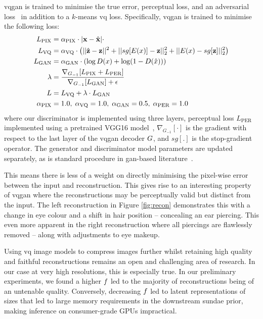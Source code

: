 \Gls{vqgan} is trained to minimise the true error, perceptual loss, and an
adversarial loss~\cite{esser2021taming} in addition to a $k$-means \gls{vq}
loss. Specifically, \gls{vqgan} is trained to minimise the following
loss:
\begin{align}
\begin{split}
    L_\text{PIX} &= \alpha_\text{PIX} \cdot |\mathbf{x} - \hat{\mathbf{x}}| \cdot \\
    L_\text{VQ} &= \alpha_\text{VQ} \cdot \left(||\hat{\mathbf{z}} -
    \mathbf{z}||^2 + ||sg[E(x)] - \mathbf{z}||^2_2 + ||E(x) -
    sg[\mathbf{z}]||^2_2\right)\\
    L_\text{GAN} &= \alpha_\text{GAN} \cdot \left(\log D(x) + \log
    (1-D(\hat{x}))\right) \\
    \lambda &= \frac{\nabla_{G_{-1}}[L_\text{PIX} +
    L_\text{PER}]}{\nabla_{G_{-1}}[L_\text{GAN}] + \epsilon}\\
    L &= L_\text{VQ} + \lambda \cdot L_\text{GAN}\\
    \alpha_\text{PIX} &= 1.0,\; \alpha_\text{VQ} = 1.0,\; \alpha_\text{GAN} = 0.5,\; \alpha_\text{PER} = 1.0
\end{split}
\end{align}
\cite{esser2021taming} where our discriminator is implemented using three
layers, perceptual loss $L_\text{PER}$ implemented using a pretrained VGG16
model~\cite{karen2014vg18}, $\nabla_{G_{-1}}[\cdot]$ is the gradient with
respect to the last layer of the \gls{vqgan} decoder $G$, and
$sg[.]$ is the stop-gradient operator. The
generator and discriminator model parameters are updated separately, as is
standard procedure in \gls{gan}-based literature~\cite{esser2021taming}.

This means there is less of a weight on directly minimising the pixel-wise error
between the input and reconstruction. This gives rise to an interesting property
of \gls{vqgan} where the reconstructions may be perceptually valid but 
distinct from the input. The left reconstruction in Figure \ref{fig:recon}
demonstrates this with a change in eye colour and a shift in hair position --
concealing an ear piercing. This even more apparent in the right reconstruction
where all piercings are flawlessly removed -- along with adjustments to eye
makeup.

Using \gls{vq} image models to compress images further whilst retaining high
quality and faithful reconstructions remains an open and challenging area of
research. In our case at very high resolutions, this is especially true. In our
preliminary experiments, we found a higher $f$ led to the 
majority of reconstructions being of an untenable quality. Conversely, decreasing
$f$ led to latent representations of sizes that led to large
memory requirements in the downstream \gls{sundae} prior, making inference on
consumer-grade GPUs impractical.

